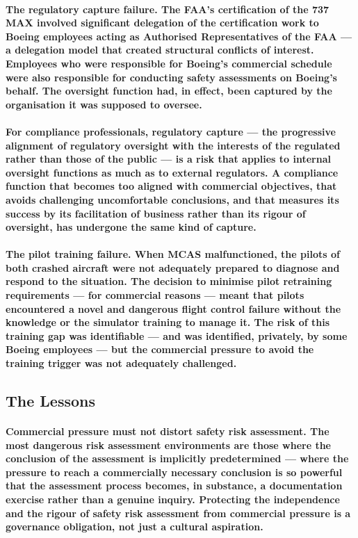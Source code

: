 \paragraph{\textbf{The regulatory capture failure}. The FAA's certification of the 737 MAX involved significant delegation of the certification work to Boeing employees acting as Authorised Representatives of the FAA — a delegation model that created structural conflicts of interest. Employees who were responsible for Boeing's commercial schedule were also responsible for conducting safety assessments on Boeing's behalf. The oversight function had, in effect, been captured by the organisation it was supposed to oversee.}
\paragraph{For compliance professionals, regulatory capture — the progressive alignment of regulatory oversight with the interests of the regulated rather than those of the public — is a risk that applies to internal oversight functions as much as to external regulators. A compliance function that becomes too aligned with commercial objectives, that avoids challenging uncomfortable conclusions, and that measures its success by its facilitation of business rather than its rigour of oversight, has undergone the same kind of capture.}
\paragraph{\textbf{The pilot training failure}. When MCAS malfunctioned, the pilots of both crashed aircraft were not adequately prepared to diagnose and respond to the situation. The decision to minimise pilot retraining requirements — for commercial reasons — meant that pilots encountered a novel and dangerous flight control failure without the knowledge or the simulator training to manage it. The risk of this training gap was identifiable — and was identified, privately, by some Boeing employees — but the commercial pressure to avoid the training trigger was not adequately challenged.}

\subsection{The Lessons}
\paragraph{\textbf{Commercial pressure must not distort safety risk assessment}. The most dangerous risk assessment environments are those where the conclusion of the assessment is implicitly predetermined — where the pressure to reach a commercially necessary conclusion is so powerful that the assessment process becomes, in substance, a documentation exercise rather than a genuine inquiry. Protecting the independence and the rigour of safety risk assessment from commercial pressure is a governance obligation, not just a cultural aspiration.}
